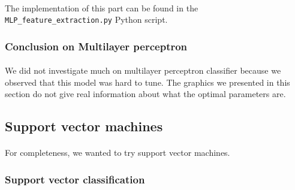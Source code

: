\documentclass[a4paper, 11pt, oneside]{article}
\begin{document}
\paragraph{}The implementation of this part can be found in the \texttt{MLP\_feature\_extraction.py} Python script.

\subsubsection{Conclusion on Multilayer perceptron}

\paragraph{}We did not investigate much on multilayer perceptron classifier because we observed that this model was hard to tune. The graphics we presented in this section do not give real information about what the optimal parameters are.


\subsection{Support vector machines}
\paragraph{}For completeness, we wanted to try support vector machines.

\subsubsection{Support vector classification} \label{subsubsec:svc}
\end{document}
